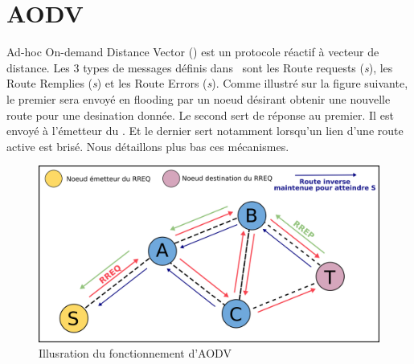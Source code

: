 \chapter{AODV}
    Ad-hoc On-demand Distance Vector (\aodv) est un protocole réactif à vecteur de distance.
    Les 3 types de messages définis dans \aodv\ sont les Route requests (\textit{\rreq s}),
    les Route Remplies (\textit{\rrep s}) et les Route Errors (\textit{\rrer s}).
    Comme illustré sur la figure suivante, le premier sera envoyé en flooding par un noeud désirant obtenir une nouvelle route pour
    une desination donnée. Le second sert de réponse au premier. Il est envoyé à l'émetteur du
    \rreq. Et le dernier sert notamment lorsqu'un lien d'une route active est brisé. 
    Nous détaillons plus bas ces mécanismes.
    \vspace{1cm}
    \begin{figure}[H]
        \centering
        \includegraphics[scale=0.35]{images/aodv.png}
        \caption{Illusration du fonctionnement d'AODV}
        \label{aodv}
    \end{figure}
    
    
    \vspace{0.5cm}
